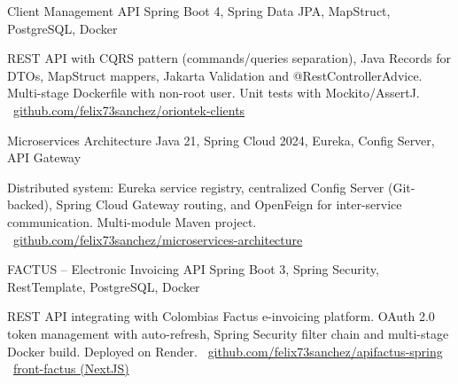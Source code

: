 \documentclass[]{awesome-cv}
\begin{document}
\begin{cventries}
	\vspace{-3mm}
	\cventry
	{}
	{Client Management API \vspace{-5mm}}
	{Spring Boot 4, Spring Data JPA, MapStruct, PostgreSQL, Docker \vspace{-5mm}}
	{}
	{\begin{cvsectionnormaltext}
		\item {REST API with CQRS pattern (commands/queries separation), Java Records for DTOs, MapStruct mappers, Jakarta Validation and @RestControllerAdvice. Multi-stage Dockerfile with non-root user. Unit tests with Mockito/AssertJ.
		\newline \faGithubSquare\ \href{https://github.com/felix73sanchez/oriontek-clients}{github.com/felix73sanchez/oriontek-clients}}
	\end{cvsectionnormaltext}}

	\vspace{-3mm}
	\cventry
	{}
	{Microservices Architecture \vspace{-5mm}}
	{Java 21, Spring Cloud 2024, Eureka, Config Server, API Gateway \vspace{-5mm}}
	{}
	{\begin{cvsectionnormaltext}
		\item {Distributed system: Eureka service registry, centralized Config Server (Git-backed), Spring Cloud Gateway routing, and OpenFeign for inter-service communication. Multi-module Maven project.
		\newline \faGithubSquare\ \href{https://github.com/felix73sanchez/microservices-architecture}{github.com/felix73sanchez/microservices-architecture}}
	\end{cvsectionnormaltext}}

	\vspace{-3mm}
	\cventry
	{}
	{FACTUS -- Electronic Invoicing API \vspace{-5mm}}
	{Spring Boot 3, Spring Security, RestTemplate, PostgreSQL, Docker \vspace{-5mm}}
	{}
	{\begin{cvsectionnormaltext}
		\item {REST API integrating with Colombia\textquotesingle{}s Factus e-invoicing platform. OAuth 2.0 token management with auto-refresh, Spring Security filter chain and multi-stage Docker build. Deployed on Render.
		\newline \faGithubSquare\ \href{https://github.com/felix73sanchez/apifactus-spring}{github.com/felix73sanchez/apifactus-spring}
		\hspace{1mm} \faGithubSquare\ \href{https://github.com/felix73sanchez/front-factus}{front-factus (NextJS)}}
	\end{cvsectionnormaltext}}


\end{cventries}
\end{document}
